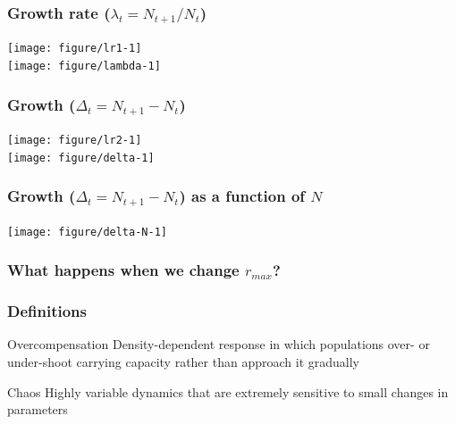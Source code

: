 \documentclass[color=usenames,dvipsnames]{beamer}\usepackage[]{graphicx}\usepackage[]{color}
\begin{document}
\begin{frame}[fragile]
  \frametitle{Growth rate ($\lambda_t = N_{t+1}/N_t$)}


\begin{center}
  \texttt{[image: figure/lr1-1]} \\ \vfill
  \texttt{[image: figure/lambda-1]}
\end{center}
\end{frame}







\begin{frame}[fragile]
  \frametitle{Growth ($\Delta_t=N_{t+1}-N_t$)}


\begin{center}
  \texttt{[image: figure/lr2-1]} \\ \vfill
  \texttt{[image: figure/delta-1]}
\end{center}
\end{frame}



\begin{frame}[fragile]
  \frametitle{Growth ($\Delta_t=N_{t+1}-N_t$) as a function of $N$}

\begin{center}
  \texttt{[image: figure/delta-N-1]}
\end{center}
\end{frame}






\begin{frame}[fragile]
  \frametitle{What happens when we change $r_{max}$?}





\begin{center}
\end{center}
\end{frame}





\begin{frame}
  \frametitle{Definitions}
  \begin{block}{Overcompensation}
    Density-dependent response in which populations over- or
    under-shoot carrying capacity rather than approach it gradually
  \end{block}
  \pause
  \begin{block}{Chaos}
    Highly variable dynamics that are extremely sensitive to small
    changes in parameters
  \end{block}
\end{frame}
\end{document}
